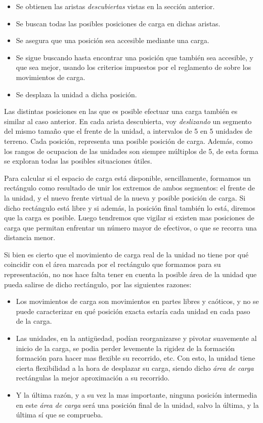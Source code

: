 \begin{itemize}
\item Se obtienen las aristas \emph{descubiertas} vistas en la sección
  anterior.
\item Se buscan todas las posibles posiciones de carga en dichas
  aristas.
\item Se asegura que una posición sea accesible mediante una carga.
\item Se sigue buscando hasta encontrar una posición que también sea
  accesible, y que sea mejor, usando los criterios impuestos por el
  reglamento de \gom sobre los movimientos de carga.
\item Se desplaza la unidad a dicha posición.
\end{itemize}

Las distintas posiciones en las que es posible efectuar una carga
también es similar al caso anterior. En cada arista descubierta, voy
\emph{deslizando} un segmento del mismo tamaño que el frente de la
unidad, a intervalos de 5 en 5 unidades de terreno. Cada posición,
representa una posible posición de carga. Además, como los rangos de
ocupacion de las unidades son siempre múltiplos de 5, de esta forma se
exploran todas las posibles situaciones útiles.

Para calcular si el espacio de carga está disponible, sencillamente,
formamos un rectángulo como resultado de unir los extremos de ambos
segmentos: el frente de la unidad, y el nuevo frente virtual de la
nueva y posible posición de carga. Si dicho rectángulo está libre y si
además, la posición final también lo está, diremos que la carga es
posible. Luego tendremos que vigilar si existen mas posiciones de
carga que permitan enfrentar un número mayor de efectivos, o que se
recorra una distancia menor.

Si bien es cierto que el movimiento de carga real de la unidad no tiene
por qué coincidir con el área marcada por el rectángulo que formamos para su
representación, no nos hace falta tener en cuenta la posible área de
la unidad que pueda salirse de dicho rectángulo, por las siguientes razones:

\begin{itemize}
\item Los movimientos de carga son movimientos en partes libres y
  caóticos, y no se puede caracterizar en qué posición exacta estaría
  cada unidad en cada paso de la carga.
\item Las unidades, en la antigüedad, podían reorganizarse y
  pivotar suavemente al inicio de la carga, se podia perder levemente
  la rigidez de la formación 
  formación para hacer mas flexible su recorrido, etc. Con esto, la
  unidad tiene cierta flexibilidad a la hora de desplazar su carga,
  siendo dicho \emph{área de carga} rectángulas la mejor aproximación
  a su recorrido.
\item Y la última razón, y a su vez la mas importante, ninguna
  posición intermedia en este \emph{área de carga} será
  una posición final de la unidad, salvo la última, y la última sí que
  se comprueba.
\end{itemize}

